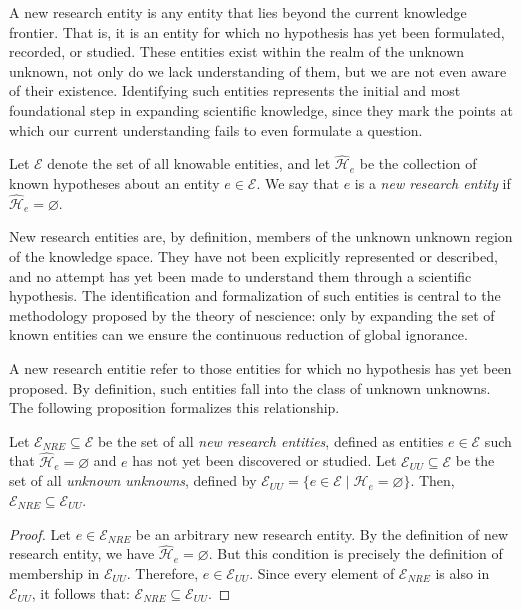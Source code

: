 A new research entity is any entity that lies beyond the current knowledge frontier. That is, it is an entity for which no hypothesis has yet been formulated, recorded, or studied. These entities exist within the realm of the unknown unknown, not only do we lack understanding of them, but we are not even aware of their existence. Identifying such entities represents the initial and most foundational step in expanding scientific knowledge, since they mark the points at which our current understanding fails to even formulate a question.

\begin{definition}
Let $\mathcal{E}$ denote the set of all knowable entities, and let $\hat{\mathcal{H}}_e$ be the collection of known hypotheses about an entity $e \in \mathcal{E}$. We say that $e$ is a \emph{new research entity} if $\hat{\mathcal{H}}_e = \varnothing$.
\end{definition}

New research entities are, by definition, members of the unknown unknown region of the knowledge space. They have not been explicitly represented or described, and no attempt has yet been made to understand them through a scientific hypothesis. The identification and formalization of such entities is central to the methodology proposed by the theory of nescience: only by expanding the set of known entities can we ensure the continuous reduction of global ignorance.

A new research entitie refer to those entities for which no hypothesis has yet been proposed. By definition, such entities fall into the class of unknown unknowns. The following proposition formalizes this relationship.

\begin{proposition}
Let $\mathcal{E}_{NRE} \subseteq \mathcal{E}$ be the set of all \emph{new research entities}, defined as entities $e \in \mathcal{E}$ such that $\hat{\mathcal{H}}_e = \varnothing$ and $e$ has not yet been discovered or studied. Let $\mathcal{E}_{UU} \subseteq \mathcal{E}$ be the set of all \emph{unknown unknowns}, defined by $\mathcal{E}_{UU} = \{ e \in \mathcal{E} \mid \hat{\mathcal{H}}_e = \varnothing \}$. Then, $\mathcal{E}_{NRE} \subseteq \mathcal{E}_{UU}$.
\end{proposition}
\begin{proof}
Let $e \in \mathcal{E}_{NRE}$ be an arbitrary new research entity. By the definition of new research entity, we have $\hat{\mathcal{H}}_e = \varnothing$. But this condition is precisely the definition of membership in $\mathcal{E}_{UU}$. Therefore, $e \in \mathcal{E}_{UU}$. Since every element of $\mathcal{E}_{NRE}$ is also in $\mathcal{E}_{UU}$, it follows that: $\mathcal{E}_{NRE} \subseteq \mathcal{E}_{UU}$.
\end{proof}

